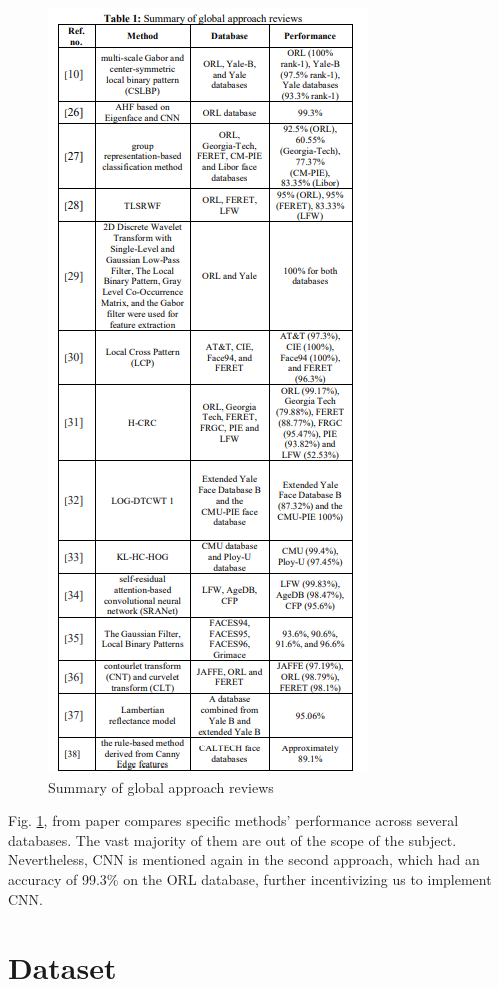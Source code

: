 \documentclass[conference]{IEEEtran}
\begin{document}
\begin{figure}[]
    \centering
    \includegraphics[scale=1]{images/14_moung_table.png}
    \caption{Summary of global approach reviews\cite{moung_paper}}
    \label{fig:moung_table}
\end{figure}


Fig. \ref{fig:moung_table}, from paper\cite{moung_paper} compares specific methods' performance across several databases. The vast majority of them are out of the scope of the subject. Nevertheless, CNN is mentioned again in the second approach, which had an accuracy of 99.3\% on the ORL database, further incentivizing us to implement CNN.

\section{Dataset}
\end{document}
